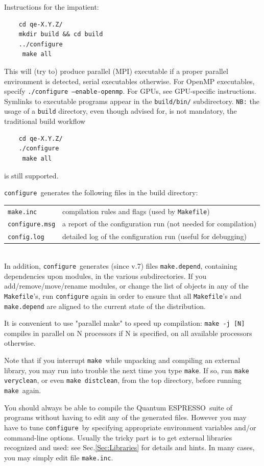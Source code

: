 \documentclass[12pt,a4paper]{article}
\def\qe{{\sc Quantum ESPRESSO}}
\def\configure{\texttt{configure}}
\def\make{\texttt{make}}
\begin{document}
Instructions for the impatient:
\begin{verbatim}
    cd qe-X.Y.Z/
    mkdir build && cd build
    ../configure
     make all
\end{verbatim}
This will (try to) produce parallel (MPI) executable if a proper parallel
environment is detected, serial executables otherwise. For OpenMP executables,
specify \texttt{./configure --enable-openmp}. For  GPUs, see GPU-specific
instructions. Symlinks to executable programs appear in the \texttt{build/bin/} 
subdirectory.
\texttt{NB:} the usage of a \texttt{build} directory, even though advised for, 
is not mandatory, the traditional build workflow
\begin{verbatim}
    cd qe-X.Y.Z/
    ./configure
     make all
\end{verbatim}
is still supported.

\noindent \configure\ generates the following files in the build directory:

\begin{tabular}{ll}
\texttt{make.inc} &      compilation rules and flags (used by \texttt{Makefile})\\
\texttt{configure.msg} & a report of the configuration run (not needed for compilation)\\
\texttt{config.log} & detailed log of the configuration run (useful for debugging)\\
\end{tabular}\\
In addition, \configure\ generates (since v.7) files \texttt{make.depend},
containing dependencies upon modules, in the various subdirectories.
If you add/remove/move/rename modules, or change the list of objects
in any of the \texttt{Makefile}'s, run \texttt{configure} again in
order to ensure that all \texttt{Makefile}'s and \texttt{make.depend}
are aligned to the current state of the distribution.

It is convenient to use "parallel make" to speed up compilation:
\texttt{make -j [N]} compiles in parallel on N processors if N is
specified, on all available processors otherwise.

Note that if you interrupt \make\ while unpacking and compiling an external 
library, you may run into trouble the next time you type \make. 
If so, run \texttt{make veryclean}, or even \texttt{make distclean}, 
from the top directory, before running \make\ again.

You should always be able to compile the \qe\ suite
of programs without having to edit any of the generated files. However you
may have to tune \configure\ by specifying appropriate environment variables
and/or command-line options. Usually the tricky part is to get external
libraries recognized and used: see Sec.\ref{Sec:Libraries}
for details and hints. In many cases, you may simply edit file
\texttt{make.inc}. 
\end{document}
